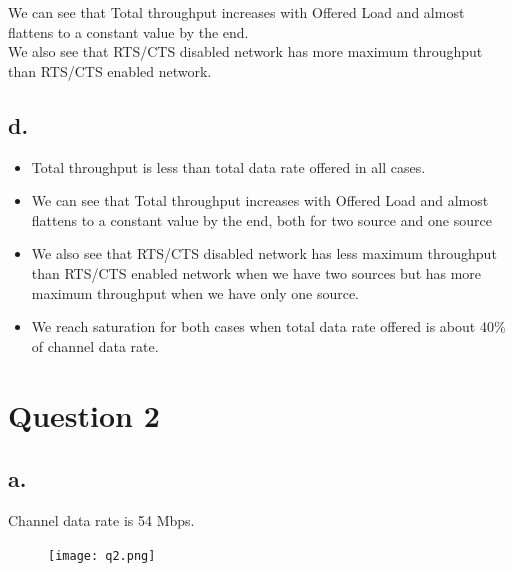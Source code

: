 \documentclass[11pt, fleqn]{article}
\begin{document}
We can see that Total throughput increases with Offered Load and almost flattens to a constant value by the end. \\
We also see that RTS/CTS disabled network has more maximum throughput than RTS/CTS enabled network. \\

\subsection*{d.}

\begin{itemize}
    \item Total throughput is less than total data rate offered in all cases.
    \item We can see that Total throughput increases with Offered Load and almost flattens to a constant value by the end, both for two source and one source
    \item We also see that RTS/CTS disabled network has less maximum throughput than RTS/CTS enabled network when we have two sources but has more maximum throughput when we have only one source.
    \item We reach saturation for both cases when total data rate offered is about 40\% of channel data rate.
\end{itemize}

\newpage
\section*{Question 2}
\setcounter{equation}{0}

\subsection*{a.}

Channel data rate is 54 Mbps.

\begin{figure}[H]
    \centering
    \texttt{[image: q2.png]}
\end{figure}
\end{document}
